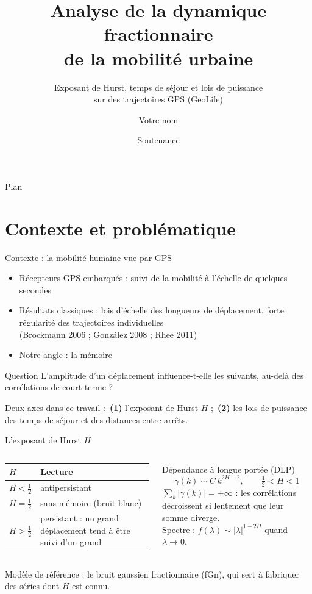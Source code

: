 \documentclass[aspectratio=169,11pt]{beamer}
\title[Dynamique fractionnaire de la mobilité]{Analyse de la dynamique fractionnaire\\de la mobilité urbaine}
\subtitle{Exposant de Hurst, temps de séjour et lois de puissance\\sur des trajectoires GPS (GeoLife)}
\author{Votre nom}            %
\institute{Master 2 \,---\, 2025--2026}
\date{Soutenance}
\begin{document}
\begin{frame}[plain]
\titlepage
\end{frame}

\begin{frame}{Plan}
\tableofcontents
\end{frame}

\section{Contexte et problématique}

\begin{frame}{Contexte : la mobilité humaine vue par GPS}
\begin{itemize}
  \item Récepteurs GPS embarqués : suivi de la mobilité à l'échelle de quelques secondes
  \item Résultats classiques : \alert{lois d'échelle} des longueurs de déplacement, forte régularité des trajectoires individuelles\\
        {\footnotesize (Brockmann 2006 ; González 2008 ; Rhee 2011)}
  \item Notre angle : la \alert{mémoire}
\end{itemize}
\begin{block}{Question}
L'amplitude d'un déplacement influence-t-elle les suivants, au-delà des corrélations de court terme ?
\end{block}
\medskip
Deux axes dans ce travail :\ \textbf{(1)} l'exposant de Hurst $H$ ;\ \textbf{(2)} les lois de puissance des temps de séjour et des distances entre arrêts.
\end{frame}

\begin{frame}{L'exposant de Hurst $H$}
\begin{columns}[T]
\begin{tabular}{@{}lp{5.4cm}@{}}
\toprule
$H$ & Lecture \\
\midrule
$H<\tfrac12$ & antipersistant \\
$H=\tfrac12$ & sans mémoire (bruit blanc) \\
$H>\tfrac12$ & persistant : un grand déplacement tend à être suivi d'un grand \\
\bottomrule
\end{tabular}
\begin{block}{Dépendance à longue portée (DLP)}
\[
\gamma(k)\sim C\,k^{2H-2},\qquad \tfrac12<H<1
\]
$\sum_k|\gamma(k)|=+\infty$ : les corrélations décroissent si lentement que leur somme diverge.\\[1mm]
Spectre : $f(\lambda)\sim|\lambda|^{1-2H}$ quand $\lambda\to0$.
\end{block}
\end{columns}
\medskip
Modèle de référence : le \alert{bruit gaussien fractionnaire} (fGn), qui sert à fabriquer des séries dont $H$ est connu.
\end{frame}
\end{document}
